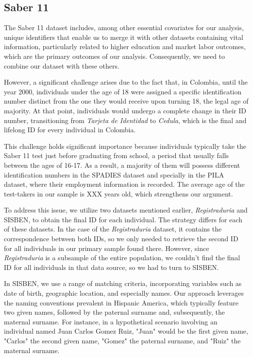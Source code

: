 \documentclass[12pt, a4paper]{article}
\begin{document}
\subsection{Saber 11}

The Saber 11 dataset includes, among other essential covariates for our analysis, unique identifiers that enable us to merge it with other datasets containing vital information, particularly related to higher education and market labor outcomes, which are the primary outcomes of our analysis. Consequently, we need to combine our dataset with these others.

However, a significant challenge arises due to the fact that, in Colombia, until the year 2000, individuals under the age of 18 were assigned a specific identification number distinct from the one they would receive upon turning 18, the legal age of majority. At that point, individuals would undergo a complete change in their ID number, transitioning from \textit{Tarjeta de Identidad} to \textit{Cedula}, which is the  final and lifelong ID for every individual in Colombia.

This challenge holds significant importance because individuals typically take the Saber 11 test just before graduating from school, a period that usually falls between the ages of 16-17. As a result, a majority of them will possess different identification numbers in the SPADIES dataset and specially in the PILA dataset, where their employment information is recorded. The average age of the test-takers in our sample is XXX years old, which strengthens our argument.

To address this issue, we utilize two datasets mentioned earlier, \textit{Registraduria} and SISBEN, to obtain the final ID for each individual. The strategy differs for each of these datasets. In the case of the \textit{Registraduria} dataset, it contains the correspondence between both IDs, so we only needed to retrieve the second ID for all individuals in our primary sample found there. However, since \textit{Registraduria} is a subsample of the entire population, we couldn't find the final ID for all individuals in that data source, so we had to turn to SISBEN.

In SISBEN, we use a range of matching criteria, incorporating variables such as date of birth, geographic location, and especially names. Our approach leverages the naming conventions prevalent in Hispanic America, which typically feature two given names, followed by the paternal surname and, subsequently, the maternal surname. For instance, in a hypothetical scenario involving an individual named Juan Carlos Gomez Ruiz, "Juan" would be the first given name, "Carlos" the second given name, "Gomez" the paternal surname, and "Ruiz" the maternal surname.
\end{document}
